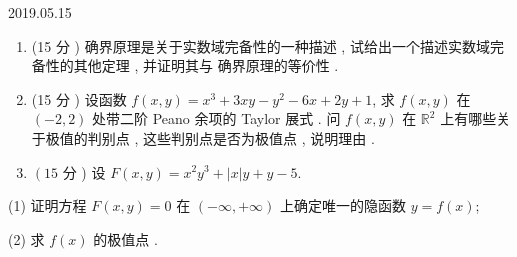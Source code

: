 \documentclass[10pt]{article}
\begin{document}
2019.05.15

\begin{enumerate}
  \item (15  分 )  确界原理是关于实数域完备性的一种描述 ,  试给出一个描述实数域完备性的其他定理 ,  并证明其与   确界原理的等价性 .

  \item (15  分 )  设函数  $f(x, y)=x^{3}+3 x y-y^{2}-6 x+2 y+1$,  求  $f(x, y)$  在  $(-2,2)$  处带二阶  Peano  余项的  Taylor  展式 .  问  $f(x, y)$  在  $\mathbb{R}^{2}$  上有哪些关于极值的判别点 ,  这些判别点是否为极值点 ,  说明理由 .

  \item $\left(15\right.$  分 )  设  $F(x, y)=x^{2} y^{3}+|x| y+y-5 .$

\end{enumerate}
(1)  证明方程  $F(x, y)=0$  在  $(-\infty,+\infty)$  上确定唯一的隐函数  $y=f(x)$;

(2)  求  $f(x)$  的极值点 .
\end{document}
